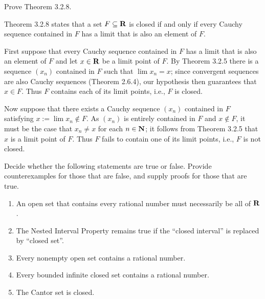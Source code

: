 \documentclass{lew98_solutions}
\begin{document}
\begin{exercise}
\label{ex:3.2.5}
    Prove Theorem 3.2.8.
\end{exercise}

\begin{solution}
    Theorem 3.2.8 states that a set \( F \subseteq \mathbf{R} \) is closed if and only if every Cauchy sequence contained in \( F \) has a limit that is also an element of \( F \). 
    
    First suppose that every Cauchy sequence contained in \( F \) has a limit that is also an element of \( F \) and let \( x \in \mathbf{R} \) be a limit point of \( F \). By Theorem 3.2.5 there is a sequence \( (x_n) \) contained in \( F \) such that \( \lim x_n = x \); since convergent sequences are also Cauchy sequences (Theorem 2.6.4), our hypothesis then guarantees that \( x \in F \). Thus \( F \) contains each of its limit points, i.e., \( F \) is closed.

    Now suppose that there exists a Cauchy sequence \( (x_n) \) contained in \( F \) satisfying \( x := \lim x_n \not\in F \). As \( (x_n) \) is entirely contained in \( F \) and \( x \not\in F \), it must be the case that \( x_n \neq x \) for each \( n \in \mathbf{N} \); it follows from Theorem 3.2.5 that \( x \) is a limit point of \( F \). Thus \( F \) fails to contain one of its limit points, i.e., \( F \) is not closed.
\end{solution}

\begin{exercise}
\label{ex:3.2.6}
    Decide whether the following statements are true or false. Provide counterexamples for those that are false, and supply proofs for those that are true.
    \begin{enumerate}
        \item An open set that contains every rational number must necessarily be all of \( \mathbf{R} \).

        \item The Nested Interval Property remains true if the ``closed interval'' is replaced by ``closed set''.

        \item Every nonempty open set contains a rational number.

        \item Every bounded infinite closed set contains a rational number.

        \item The Cantor set is closed.
    \end{enumerate}
\end{exercise}
\end{document}
